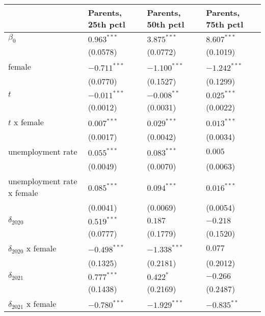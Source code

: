 \begin{tabular}{llll}
\toprule
{} & Parents, 25th pctl & Parents, 50th pctl & Parents, 75th pctl \\
\midrule
$\beta_0$                  &      $0.963^{***}$ &      $3.875^{***}$ &      $8.607^{***}$ \\
                           &           (0.0578) &           (0.0772) &           (0.1019) \\
female                     &     $-0.711^{***}$ &     $-1.100^{***}$ &     $-1.242^{***}$ \\
                           &           (0.0770) &           (0.1527) &           (0.1299) \\
$t$                        &     $-0.011^{***}$ &      $-0.008^{**}$ &      $0.025^{***}$ \\
                           &           (0.0012) &           (0.0031) &           (0.0022) \\
$t$ x female               &      $0.007^{***}$ &      $0.029^{***}$ &      $0.013^{***}$ \\
                           &           (0.0017) &           (0.0042) &           (0.0034) \\
unemployment rate          &      $0.055^{***}$ &      $0.083^{***}$ &            $0.005$ \\
                           &           (0.0049) &           (0.0070) &           (0.0063) \\
unemployment rate x female &      $0.085^{***}$ &      $0.094^{***}$ &      $0.016^{***}$ \\
                           &           (0.0041) &           (0.0069) &           (0.0054) \\
$\delta_{2020}$            &      $0.519^{***}$ &            $0.187$ &           $-0.218$ \\
                           &           (0.0777) &           (0.1779) &           (0.1520) \\
$\delta_{2020}$ x female   &     $-0.498^{***}$ &     $-1.338^{***}$ &            $0.077$ \\
                           &           (0.1325) &           (0.2181) &           (0.2012) \\
$\delta_{2021}$            &      $0.777^{***}$ &          $0.422^*$ &           $-0.266$ \\
                           &           (0.1438) &           (0.2169) &           (0.2487) \\
$\delta_{2021}$ x female   &     $-0.780^{***}$ &     $-1.929^{***}$ &      $-0.835^{**}$ \\

\end{tabular}

